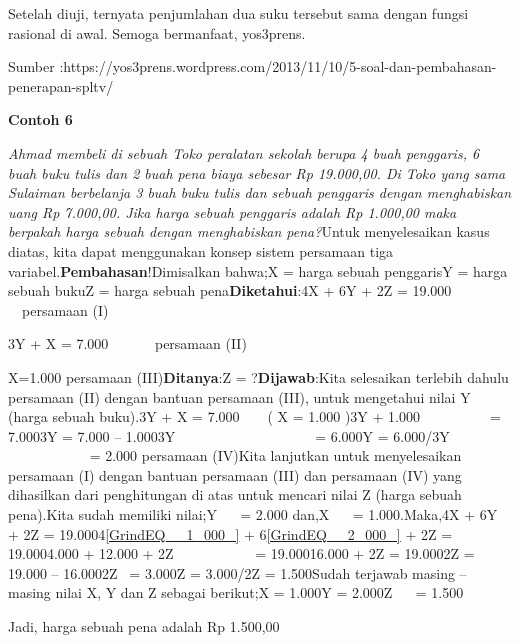 \documentclass[11pt,fleqn]{book} %
\begin{document}
\begin{myEnumerate}
\begin{itemize}
\noindent 

\noindent Setelah diuji, ternyata penjumlahan dua suku tersebut sama dengan fungsi rasional di awal. Semoga bermanfaat, yos3prens.

\noindent Sumber :https://yos3prens.wordpress.com/2013/11/10/5-soal-dan-pembahasan-penerapan-spltv/

\noindent 

\noindent \textbf{Contoh 6}

\noindent \textit{Ahmad membeli di sebuah Toko peralatan sekolah berupa 4 buah penggaris, 6 buah buku tulis dan 2 buah pena biaya sebesar Rp 19.000,00. Di Toko yang sama Sulaiman berbelanja 3 buah buku tulis dan sebuah penggaris dengan menghabiskan uang Rp 7.000,00. Jika harga sebuah penggaris adalah Rp 1.000,00 maka berpakah harga sebuah dengan menghabiskan pena?}Untuk menyelesaikan kasus diatas, kita dapat menggunakan konsep sistem persamaan tiga variabel.\textbf{Pembahasan}!Dimisalkan bahwa;X = harga sebuah penggarisY = harga sebuah bukuZ = harga sebuah pena\textbf{Diketahui}:4X + 6Y + 2Z      = 19.000 ~ ~~persamaan (I)

\noindent 3Y + X                = 7.000 ~ ~ ~~ persamaan (II)

\noindent X=1.000     persamaan (III)\textbf{Ditanya}:Z = ?\textbf{Dijawab}:Kita selesaikan terlebih dahulu persamaan (II) dengan bantuan persamaan (III), untuk mengetahui nilai Y (harga sebuah buku).3Y + X                  = 7.000 ~ ~  ( X = 1.000 )3Y + 1.000 ~ ~ ~ ~ ~~ = 7.0003Y                         = 7.000 -- 1.0003Y ~ ~ ~ ~ ~ ~ ~ ~ ~ ~ ~~  = 6.000Y                           = 6.000/3Y ~ ~ ~ ~ ~ ~ ~ ~ ~ ~ ~ ~  = 2.000         persamaan (IV)Kita lanjutkan untuk menyelesaikan persamaan (I) dengan bantuan persamaan (III) dan persamaan (IV) yang dihasilkan dari penghitungan di atas untuk mencari nilai Z (harga sebuah pena).Kita sudah memiliki nilai;Y ~ ~= 2.000 dan,X ~ ~= 1.000.Maka,4X + 6Y + 2Z                         = 19.0004\eqref{GrindEQ__1_000_} + 6\eqref{GrindEQ__2_000_} + 2Z        = 19.0004.000 + 12.000 + 2Z ~ ~ ~ ~ ~ ~~  = 19.00016.000 + 2Z                            = 19.0002Z                                           = 19.000 -- 16.0002Z~                                          = 3.000Z                                             = 3.000/2Z                                             = 1.500Sudah terjawab masing -- masing nilai X, Y dan Z sebagai berikut;X    = 1.000Y    = 2.000Z ~~ = 1.500

\noindent 

\noindent Jadi, harga sebuah pena adalah Rp 1.500,00


\end{itemize}
\end{myEnumerate}
\end{document}
